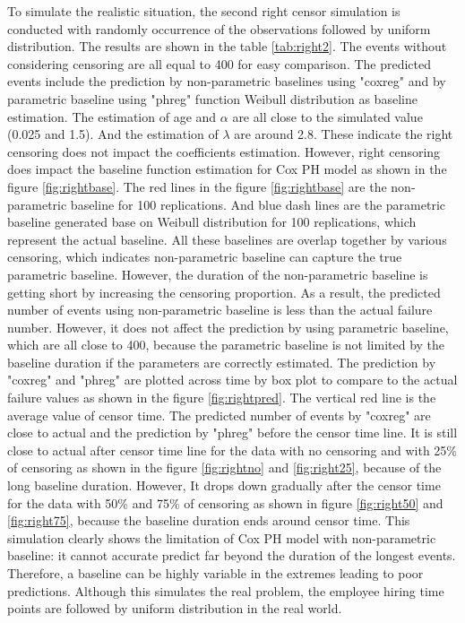 \documentclass[12pt,letterpaper]{article}
\begin{document}
To simulate the realistic situation, the second right censor simulation is conducted with randomly occurrence of the observations followed by uniform distribution. The results are shown in the table \ref{tab:right2}. The events without considering censoring are all equal to 400 for easy comparison. The predicted events include the prediction by non-parametric baselines using "coxreg" and by parametric baseline using "phreg" function Weibull distribution as baseline estimation. The estimation of age and $\alpha$ are all close to the simulated value (0.025 and 1.5). And the estimation of $\lambda$ are around 2.8. These indicate the right censoring does not impact the coefficients estimation. However, right censoring does impact the baseline function estimation for Cox PH model as shown in the figure \ref{fig:rightbase}. The red lines in the figure \ref{fig:rightbase} are the non-parametric baseline for 100 replications. And blue dash lines are the parametric baseline generated base on Weibull distribution for 100 replications, which represent the actual baseline. All these baselines are overlap together by various censoring, which indicates non-parametric baseline can capture the true parametric baseline. However, the duration of the non-parametric baseline is getting short by increasing the censoring proportion. As a result, the predicted number of events using non-parametric baseline is less than the actual failure number. However, it does not affect the prediction by using parametric baseline, which are all close to 400, because the parametric baseline is not limited by the baseline duration if the parameters are correctly estimated. The prediction by "coxreg" and "phreg" are plotted across time by box plot to compare to the actual failure values as shown in the figure \ref{fig:rightpred}. The vertical red line is the average value of censor time. The predicted number of events by "coxreg" are close to actual and the prediction by "phreg" before the censor time line. It is still close to actual after censor time line for the data with no censoring and with 25\% of censoring as shown in the figure \ref{fig:rightno} and \ref{fig:right25}, because of the long baseline duration. However, It drops down gradually after the censor time for the data with 50\% and 75\% of censoring as shown in figure \ref{fig:right50} and \ref{fig:right75}, because the baseline duration ends around censor time. This simulation clearly shows the limitation of Cox PH model with
non-parametric baseline: it cannot accurate predict far beyond the duration of the longest events. Therefore, a baseline can be highly variable in the extremes leading to poor predictions. Although this simulates the real problem, the employee hiring time points are followed by uniform distribution in the real world.
\end{document}
